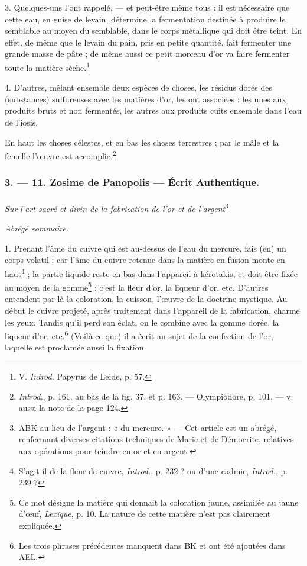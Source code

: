 \documentclass[a4paper, 11pt, oneside, polutonikogreek, french]{article}
\begin{document}
3. Quelques-uns l'ont rappelé, --- et peut-être même tous : il est nécessaire que cette eau, en guise de levain, détermine la fermentation destinée à produire le semblable au moyen du semblable, dans le corps métallique qui doit être teint. En effet, de même que le levain du pain, pris en petite quantité, fait fermenter une grande masse de pâte ; de même aussi ce petit morceau d'or va faire fermenter toute la matière sèche.\footnote{V. \emph{Introd.} Papyrus de Leide, p. 57.}

4. D'autres, mêlant ensemble deux espèces de choses, les résidus dorés des (substances) sulfureuses avec les matières d'or, les ont associées : les unes aux produits bruts et non fermentés, les autres aux produits cuits ensemble dans l'eau de l'iosis.

\bigskip
\centerline{\EightStarTaper}
\centerline{\EightStarTaper\EightStarTaper}
\bigskip

En haut les choses célestes, et en bas les choses terrestres ; par le mâle et la femelle l'œuvre est accomplie.\footnote{\emph{Introd.}, p. 161, au bas de la fig. 37, et p. 163. --- Olympiodore, p. 101, --- v. aussi la note de la page 124.}

\bigskip
\centerline{\EightStarTaper}
\centerline{\EightStarTaper\EightStarTaper}
\bigskip

\subsubsection{3. --- 11. Zosime de Panopolis --- Écrit Authentique.}
\paragraph{}
\emph{Sur l'art sacré et divin de la fabrication de l'or et de l'argent}\footnote{ABK au lieu de l'argent : « du mercure. » --- Cet article est un abrégé, renfermant diverses citations techniques de Marie et de Démocrite, relatives aux opérations pour teindre en or et en argent.}

\emph{Abrégé sommaire.}

1. Prenant l'âme du cuivre qui est au-dessus de l'eau du mercure, fais (en) un corps volatil ; car l'âme du cuivre retenue dans la matière en fusion monte en haut\footnote{S'agit-il de la fleur de cuivre, \emph{Introd.}, p. 232 ? ou d'une cadmie, \emph{Introd.}, p. 239 ?} ; la partie liquide reste en bas dans l'appareil à kérotakis, et doit être fixée au moyen de la gomme\footnote{Ce mot désigne la matière qui donnait la coloration jaune, assimilée au jaune d'œuf, \emph{Lexique}, p. 10. La nature de cette matière n'est pas clairement expliquée.} : c'est la fleur d'or, la liqueur d'or, etc. D'autres entendent par-là la coloration, la cuisson, l'œuvre de la doctrine mystique. Au début le cuivre projeté, après traitement dans l'appareil de la fabrication, charme les yeux. Tandis qu'il perd son éclat, on le combine avec la gomme dorée, la liqueur d'or, etc.\footnote{Les trois phrases précédentes manquent dans BK et ont été ajoutées dans AEL.} (Voilà ce que) il a écrit au sujet de la confection de l'or, laquelle est proclamée aussi la fixation.
\end{document}
